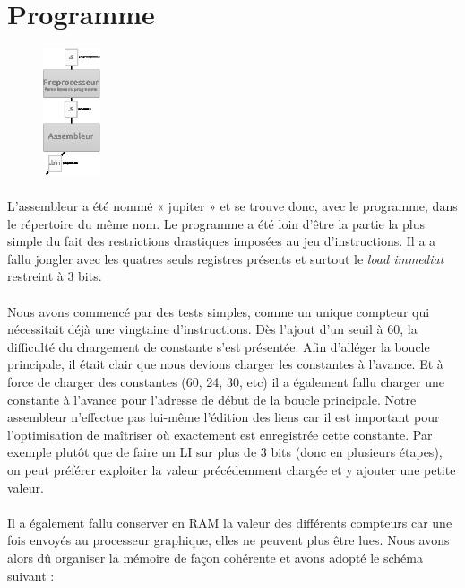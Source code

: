 \documentclass{article}
\begin{document}
\section{Programme}

\begin{figure}
\begin{center}
\includegraphics[width=0.15\textwidth]{zoom_prog.eps}
\end{center}
\end{figure}

\paragraph{}L'assembleur a été nommé « jupiter » et se trouve donc, avec le programme, dans le répertoire du même nom. Le programme a été loin d'être la partie la plus simple du fait des restrictions drastiques imposées au jeu d'instructions. Il a a fallu jongler avec les quatres seuls registres présents et surtout le \emph{load immediat} restreint à 3 bits.

\paragraph{}Nous avons commencé par des tests simples, comme un unique compteur qui nécessitait déjà une vingtaine d'instructions. Dès l'ajout d'un seuil à 60, la difficulté du chargement de constante s'est présentée. Afin d'alléger la boucle principale, il était clair que nous devions charger les constantes à l'avance. Et à force de charger des constantes (60, 24, 30, etc) il a également fallu charger une constante à l'avance pour l'adresse de début de la boucle principale. Notre assembleur n'effectue pas lui-même l'édition des liens car il est important pour l'optimisation de maîtriser où exactement est enregistrée cette constante. Par exemple plutôt que de faire un LI sur plus de 3 bits (donc en plusieurs étapes), on peut préférer exploiter la valeur précédemment chargée et y ajouter une petite valeur.

\paragraph{}Il a également fallu conserver en RAM la valeur des différents compteurs car une fois envoyés au processeur graphique, elles ne peuvent plus être lues. Nous avons alors dû organiser la mémoire de façon cohérente et avons adopté le schéma suivant :
\end{document}
